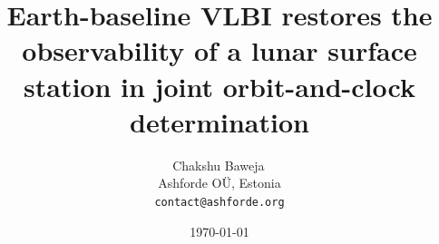 \documentclass[11pt]{article}
\title{\textbf{Earth-baseline VLBI restores the observability of a lunar
surface station in joint orbit-and-clock determination}}
\author{Chakshu Baweja\,\orcidlink{0009-0008-2098-0751}\\
\small Ashforde O\"U, Estonia \\
\small \texttt{contact@ashforde.org}}
\date{\today}
\begin{document}
\maketitle

\begin{abstract}

\end{abstract}














\end{document}
